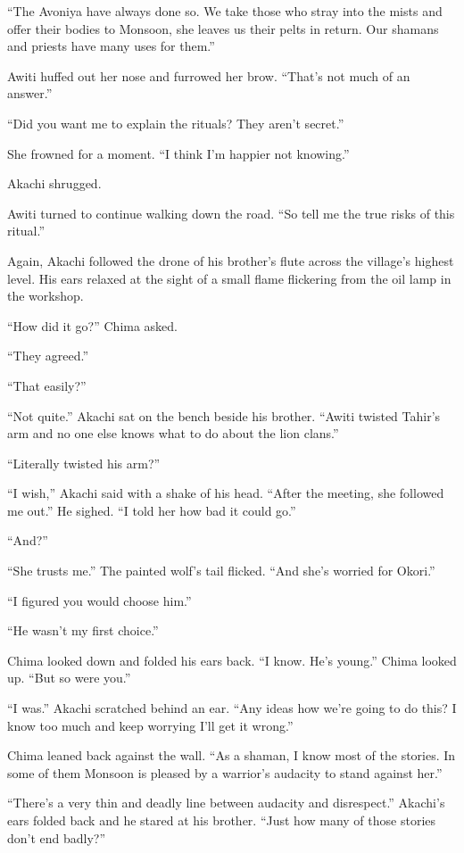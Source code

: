 ``The Avoniya have always done so. We take those who stray into the mists and offer their bodies to Monsoon, she leaves us their pelts in return. Our shamans and priests have many uses for them.''

Awiti huffed out her nose and furrowed her brow. ``That's not much of an answer.''

``Did you want me to explain the rituals? They aren't secret.''

She frowned for a moment. ``I think I'm happier not knowing.''

Akachi shrugged.

Awiti turned to continue walking down the road. ``So tell me the true risks of this ritual.''

\secdiv

\noindent Again, Akachi followed the drone of his brother's flute across the village's highest level. His ears relaxed at the sight of a small flame flickering from the oil lamp in the workshop.

 ``How did it go?'' Chima asked.

``They agreed.''

``That easily?''

``Not quite.'' Akachi sat on the bench beside his brother. ``Awiti twisted Tahir's arm and no one else knows what to do about the lion clans.''

``Literally twisted his arm?''

``I wish,'' Akachi said with a shake of his head. ``After the meeting, she followed me out.'' He sighed. ``I told her how bad it could go.''

``And?''

``She trusts me.'' The painted wolf's tail flicked. ``And she's worried for Okori.''

``I figured you would choose him.''

``He wasn't my first choice.''

Chima looked down and folded his ears back. ``I know. He's young.'' Chima looked up. ``But so were you.''

``I was.'' Akachi scratched behind an ear. ``Any ideas how we're going to do this? I know too much and keep worrying I'll get it wrong.''

Chima leaned back against the wall. ``As a shaman, I know most of the stories. In some of them Monsoon is pleased by a warrior's audacity to stand against her.''

``There's a very thin and deadly line between audacity and disrespect.'' Akachi's ears folded back and he stared at his brother. ``Just how many of those stories don't end badly?''

